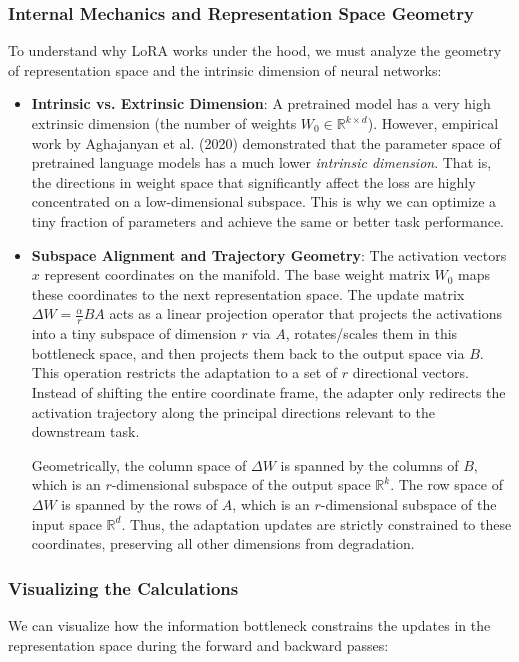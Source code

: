\subsubsection{Internal Mechanics and Representation Space Geometry}
To understand why LoRA works under the hood, we must analyze the geometry of representation space and the intrinsic dimension of neural networks:
\begin{itemize}
  \item \textbf{Intrinsic vs. Extrinsic Dimension}: A pretrained model has a very high extrinsic dimension (the number of weights $W_0 \in \mathbb{R}^{k \times d}$). However, empirical work by Aghajanyan et al. (2020) demonstrated that the parameter space of pretrained language models has a much lower \textit{intrinsic dimension}. That is, the directions in weight space that significantly affect the loss are highly concentrated on a low-dimensional subspace. This is why we can optimize a tiny fraction of parameters and achieve the same or better task performance.
  \item \textbf{Subspace Alignment and Trajectory Geometry}: The activation vectors $x$ represent coordinates on the manifold. The base weight matrix $W_0$ maps these coordinates to the next representation space. The update matrix $\Delta W = \frac{\alpha}{r} B A$ acts as a linear projection operator that projects the activations into a tiny subspace of dimension $r$ via $A$, rotates/scales them in this bottleneck space, and then projects them back to the output space via $B$. This operation restricts the adaptation to a set of $r$ directional vectors. Instead of shifting the entire coordinate frame, the adapter only redirects the activation trajectory along the principal directions relevant to the downstream task.
  
  Geometrically, the column space of $\Delta W$ is spanned by the columns of $B$, which is an $r$-dimensional subspace of the output space $\mathbb{R}^{k}$. The row space of $\Delta W$ is spanned by the rows of $A$, which is an $r$-dimensional subspace of the input space $\mathbb{R}^{d}$. Thus, the adaptation updates are strictly constrained to these coordinates, preserving all other dimensions from degradation.
\end{itemize}

\subsubsection{Visualizing the Calculations}
We can visualize how the information bottleneck constrains the updates in the representation space during the forward and backward passes:

